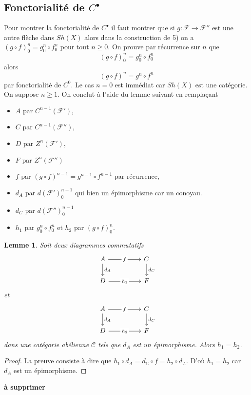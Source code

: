\documentclass[a4paper,12pt]{article}
\newcommand{\Cat}{\mathcal{C}}
\newcommand{\F}{\mathscr F}
\theoremstyle{plain}
\newtheorem{lem}[subsection]{Lemme}
\theoremstyle{definition}
\theoremstyle{remark}
\begin{document}
\subsection{Fonctorialité de $C^\bullet$}
Pour montrer la fonctorialité de $C^\bullet$ il faut montrer que
si $g\colon \F\to \F''$ est une autre flèche dans $Sh(X)$ alors 
dans la construction de 5) on a $(g\circ f)_0^n=g_0^n\circ f_0^n$
pour tout $n\geq 0$. On prouve par récurrence sur $n$ que
\[(g\circ f)_0^n=g_0^n\circ f_0^n\]
alors 
\[(g\circ f)^n=g^n\circ f^n\]
par fonctorialité de $C^0$. Le cas $n=0$ est immédiat car $Sh(X)$ est
une catégorie. On suppose $n\geq 1$.
On conclut à l'aide du lemme suivant en remplaçant 
\begin{itemize}
	\item $A$ par $C^{n-1}(\F')$,
	\item $C$ par $C^{n-1}(\F'')$,
	\item $D$ par $Z^n(\F')$,
	\item $F$ par $Z^n(\F'')$
	\item $f$ par $(g\circ f)^{n-1}=g^{n-1}\circ f^{n-1}$ par récurrence,
	\item $d_A$ par $d(\F')_0^{n-1}$ qui bien un épimorphisme
		car un conoyau.
	\item $d_C$ par $d(\F'')_0^{n-1}$
	\item $h_1$ par $g_0^n\circ f_0^n$ et $h_2$ par $(g\circ f)_0^n$.
\end{itemize}
\begin{lem}
	Soit deux diagrammes commutatifs 
\[\begin{tikzcd}
	A && C \\
	D && F
	\arrow["f"{description}, from=1-1, to=1-3]
	\arrow["{d_A}", from=1-1, to=2-1]
	\arrow["{d_C}", from=1-3, to=2-3]
	\arrow["{h_1}"{description}, from=2-1, to=2-3]
\end{tikzcd}\]
	et 
\[\begin{tikzcd}
	A && C \\
	D && F
	\arrow["f"{description}, from=1-1, to=1-3]
	\arrow["{d_A}", from=1-1, to=2-1]
	\arrow["{d_C}", from=1-3, to=2-3]
	\arrow["h_2"{description}, from=2-1, to=2-3]
\end{tikzcd}\]
	dans une catégorie abélienne $\Cat$ tels que $d_A$
	est un épimorphisme. Alors $h_1=h_2$.
\end{lem}
\begin{proof}
	La preuve consiste à dire que 
	$h_1\circ d_A=d_C\circ f=h_2\circ d_A$. D'où $h_1=h_2$ car
	$d_A$ est un épimorphisme.
\end{proof}
\textbf{à supprimer}
\end{document}
